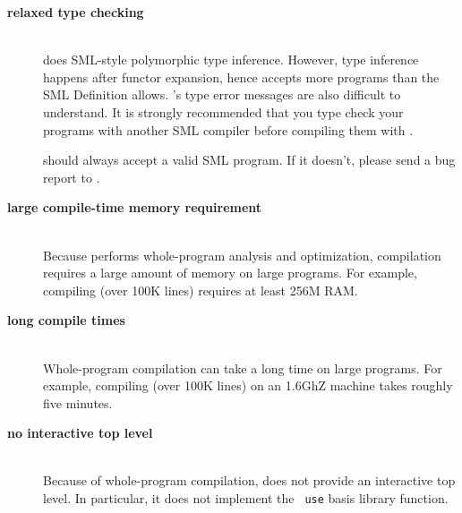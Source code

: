 
\newcommand{\drawback}[1]{\item[\bf #1]\hspace{1in}\\}

\begin{description}

\drawback{relaxed type checking}
{\mlton} does SML-style polymorphic type inference.  However, type
inference happens after functor expansion, hence {\mlton} accepts more
programs than the SML Definition allows.  {\mlton}'s type error messages
are also difficult to understand.  It is strongly recommended that you
type check your programs with another SML compiler before compiling
them with {\mlton}.

{\mlton} should always accept a valid SML program.  If it doesn't,
please send a bug report to {\mltonmail}.

\drawback{large compile-time memory requirement}
Because {\mlton} performs whole-program analysis and optimization,
compilation requires a large amount of memory on large programs.  For
example, compiling {\mlton} (over 100K lines) requires at least 256M
RAM.

\drawback{long compile times}
Whole-program compilation can take a long time on large programs.  For
example, compiling {\mlton} (over 100K lines) on an 1.6GhZ machine
takes roughly five minutes.

\drawback{no interactive top level}
Because of whole-program compilation, {\mlton} does not provide an
interactive top level.  In particular, it does not implement the {\tt
use} basis library function.

\end{description}
